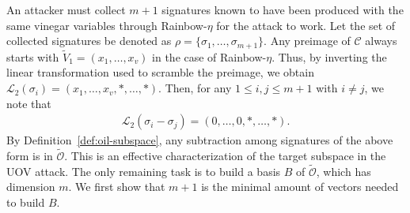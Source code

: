 \documentclass[english]{ufsc-thesis-rn46-2019/ufsc-thesis-rn46-2019}
\theoremstyle{definition}
\begin{document}
An attacker must collect $m + 1$ signatures known to have been produced with
the same vinegar variables through Rainbow-$\eta$ for the attack to work. Let
the set of collected signatures be denoted as
$\rho = \{\sigma_{1}, \dots, \sigma_{m + 1}\}$. Any preimage of $\mathcal{C}$
always starts with $\widetilde{V}_{1} = (x_{1}, \dots, x_{v})$ in the case of
Rainbow-$\eta$. Thus, by inverting the linear transformation used to scramble
the preimage, we obtain
$\mathcal{L}_{2}(\sigma_{i}) = (x_{1}, \dots, x_{v}, \ast, \dots, \ast)$. Then,
for any $1 \leq i, j \leq m + 1$ with $i \neq j$, we note that
\begin{align*}
  \mathcal{L}_{2}(\sigma_{i} - \sigma_{j}) = (0, \dots, 0, \ast, \dots, \ast).
\end{align*}
By Definition~\ref{def:oil-subspace}, any subtraction among signatures of the
above form is in $\widetilde{\mathcal{O}}$. This is an effective
characterization of the target subspace in the UOV attack. The only remaining
task is to build a basis $B$ of $\widetilde{\mathcal{O}}$, which has dimension
$m$. We first show that $m + 1$ is the minimal amount of vectors needed to
build $B$.
\end{document}
